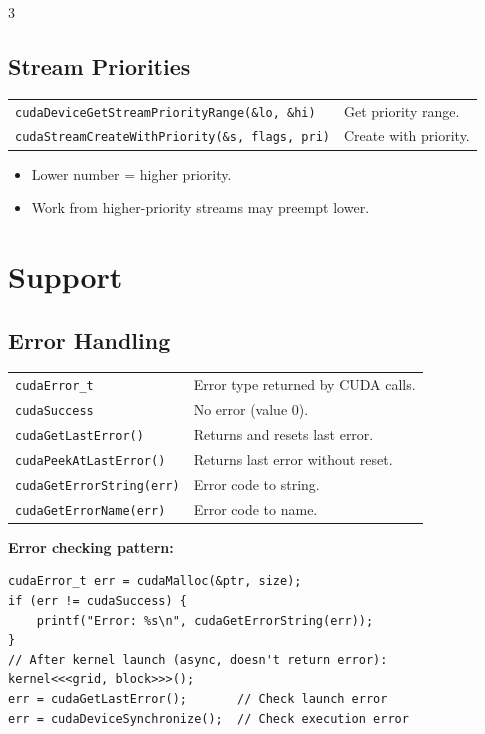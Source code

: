 \begin{multicols*}{3}
\subsection*{Stream Priorities}

\begin{tabularx}{\linewidth}{lX}
\texttt{cudaDeviceGetStreamPriorityRange(\&lo, \&hi)} & Get priority range. \\
\texttt{cudaStreamCreateWithPriority(\&s, flags, pri)} & Create with priority. \\
\end{tabularx}

\begin{itemize}[leftmargin=*,nosep]
\item Lower number = higher priority.
\item Work from higher-priority streams may preempt lower.
\end{itemize}

\newpage

\section*{Support}

\subsection*{Error Handling}

\begin{tabularx}{\linewidth}{lX}
\hline
\texttt{cudaError\_t}        & Error type returned by CUDA calls. \\
\texttt{cudaSuccess}         & No error (value 0). \\
\texttt{cudaGetLastError()}  & Returns and resets last error. \\
\texttt{cudaPeekAtLastError()} & Returns last error without reset. \\
\texttt{cudaGetErrorString(err)} & Error code to string. \\
\texttt{cudaGetErrorName(err)}   & Error code to name. \\
\hline
\end{tabularx}

\textbf{Error checking pattern:}
\begin{mdframed}[nobreak=true,backgroundcolor=gray!10,linecolor=Firebrick4]
\begin{verbatim}
cudaError_t err = cudaMalloc(&ptr, size);
if (err != cudaSuccess) {
    printf("Error: %s\n", cudaGetErrorString(err));
}
// After kernel launch (async, doesn't return error):
kernel<<<grid, block>>>();
err = cudaGetLastError();       // Check launch error
err = cudaDeviceSynchronize();  // Check execution error
\end{verbatim}
\end{mdframed}


\end{multicols*}
